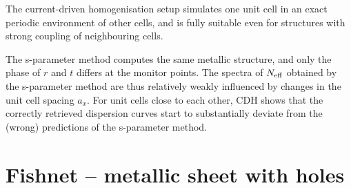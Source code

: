 The current-driven homogenisation setup simulates one unit cell in an exact periodic environment of other cells, and is fully  suitable even for structures with strong coupling of neighbouring cells. 


The s-parameter method computes the same metallic structure, and only the phase of $r$ and $t$ differs at the monitor points. The spectra of $N_{\text{eff} }$ obtained by the s-parameter method are thus relatively weakly influenced by changes in the unit cell spacing $a_x$. For unit cells close to each other, CDH shows that the correctly retrieved dispersion curves start to substantially deviate from the (wrong) predictions of the s-parameter method.




\FloatBarrier %
\section{Fishnet -- metallic sheet with holes} \label{section_fishnet}


\cite{kruk2012spatial}   %


